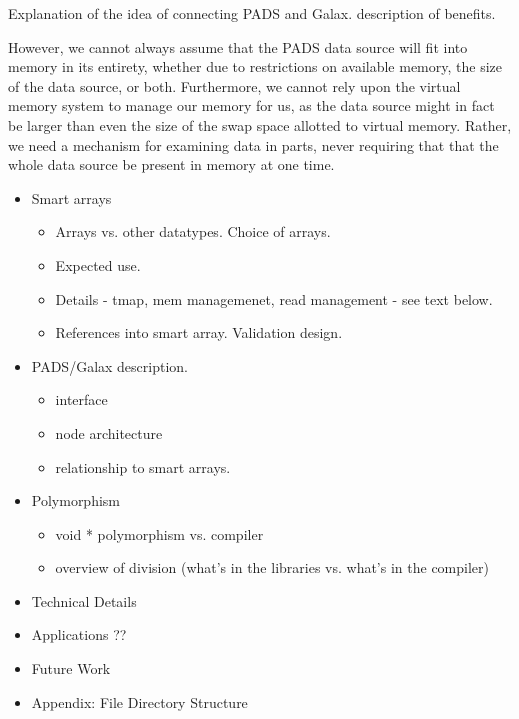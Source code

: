 \documentclass{article}
\begin{document}
Explanation of the idea of connecting PADS and Galax. description of
benefits.

However, we cannot always assume that the PADS data source will fit
into memory in its entirety, whether due to restrictions on available
memory, the size of the data source, or both. Furthermore, we cannot
rely upon the virtual memory system to manage our memory for us, as
the data source might in fact be larger than even the size of the swap
space allotted to virtual memory.  Rather, we need a mechanism for
examining data in parts, never requiring that that the whole data
source be present in memory at one time.


\begin{itemize}
\item Smart arrays
  \begin{itemize}
  \item Arrays vs. other datatypes. Choice of arrays.
  \item Expected use.
  \item Details - tmap, mem managemenet, read management - see text below.
  \item References into smart array. Validation design.
  \end{itemize}
\item PADS/Galax description.
  \begin{itemize}
  \item interface
  \item node architecture
  \item relationship to smart arrays.
  \end{itemize}
\item Polymorphism
  \begin{itemize}
  \item void * polymorphism vs. compiler
  \item overview of division (what's in the libraries vs. what's in
  the compiler)
  \end{itemize}
\item Technical Details
\item Applications ??
\item Future Work
\item Appendix: File Directory Structure
\end{itemize}
\end{document}
